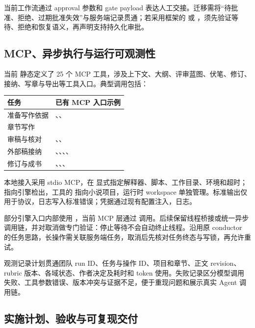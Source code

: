 当前工作流通过 approval 参数和 gate payload 表达人工交接。迁移需将“待批准、拒绝、过期批准失效”与服务端记录贯通；若采用框架的  或 ，须先验证等待、拒绝和恢复语义，再声明支持持久化审批。

\subsection{MCP、异步执行与运行可观测性}

当前  静态定义了 25 个 MCP 工具，涉及上下文、大纲、评审蓝图、伏笔、修订、接纳、写章与导出等工具入口。典型调用包括：

\noindent\begin{tabularx}{\textwidth}{@{}p{}Y@{}}
\toprule
任务 & 已有 MCP 入口示例 \\
\midrule
准备写作依据 & 、、 \\
章节写作 &  \\
审稿与核对 & 、、 \\
外部稿接纳 & 、、、、 \\
修订与成书 & 、、、 \\
\bottomrule
\end{tabularx}

本地接入采用 stdio MCP，在  显式指定解释器、脚本、工作目录、环境和超时； 指向引擎检出，工具的  指向小说项目，运行时 workspace 单独管理。标准输出仅用于协议，日志写入标准错误；凭据通过现有配置注入，日志。

部分引擎入口内部使用 ，当前 MCP 层通过  调用。后续保留线程桥接或统一异步调用链，并对取消做专门验证：停止等待不会自动终止线程。沿用原 conductor 的任务思路，长操作需关联服务端任务，取消后先核对任务终态与写锁，再允许重试。

观测记录计划贯通团队 run ID、任务与操作 ID、项目和章节、正文 revision、rubric 版本、各域状态、作者决定及耗时和 token 使用。失败记录区分模型调用失败、工具参数错误、版本冲突与证据不足，便于重现问题和展示真实 Agent 调用链。

\subsection{实施计划、验收与可复现交付}


